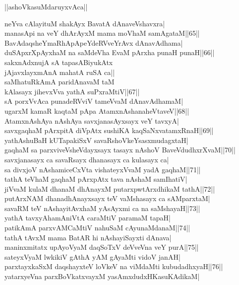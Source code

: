 \documentclass{article}
\begin{document}
\begin{center}
||ashoVkasuMdaruyxvAca||
\end{center}

neYva cAlayituM shakAyx BavatA dAnaveVshavxra|\\
manasApi na veY dhArAyxM mama moVhaM samAgataM||65||\\
BavAdaqsheYmaRhApApeYdeRVveYrAvx dAnavAdhama|\\
duSApxrXpAyxhaM na saMdeVha EvaM pArxha punaH punaH||66||\\
sakxnAdxnujA sA tapasABiyukAtx\\
jAjavxlayxmAnA mahatA ruSA ca||\\
saMhatuRkAmA paridAnavaM taM\\
kAlasayx jihevxVva yathA suPxraMtiV||67||\\
sA porxVvAca punadeRVviV tameVvaM dAnavAdhamaM|\\
ugarxM kamaR kaqtaM pApa AtamxnAshanaheVtaveV||68||\\
AtamxnAshAya nAshAya savxjanasAyxsayx veY tavxyA|\\
savxgaqhaM pArxpitA diVpAtx sushiKA kaqSaNxvatamxRnaH||69||\\
yathAshuBaH kUTapakiSxV savaRshoVkeYsasxmudagxtaH|\\
gaqhaM sa parxviveVsheVdayxsayx tasayx nAshoV BaveVdudhxrXvaM||70||\\
savxjanasayx ca savaRsayx dhanasayx ca kulasayx ca|\\
sa divxjoV nAshamiceCxVta vishateyxVvaM yadA gaqhaM||71||\\
tathA teVhaM gaqhaM pArxpAtx tava nAshaM samIhatiV|\\
jiVvaM kulaM dhanaM dhAnayxM putarxpwtArxdhikaM tathA||72||\\
putArxNAM dhanadhAnayxsayx teV vaMshasayx ca sAMparxtaM|\\
savaRM teV nAshayitAvxhaM yAsAyxmi ca na saMshayaH||73||\\
yathA tavxyAhamAniVtA caraMtiV paramaM tapaH|\\
patikAmA parxvAMCaMtiV nahuSaM cAyunaMdanaM||74||\\
tathA tAvxM mama BatAR hi nAshayiSayxti dAnava|\\
maninxmitatx upAyoVyaM daqSoTxV deVveVna veY purA||75||\\
sateyxVyaM lwkikiV gAthA yAM gAyaMti vidoV janAH|\\
parxtayxkaSxM daqshayxteV loVkeV na viMdaMti kubudadhxyaH||76||\\
yatarxyeVna parxBoVkatxvayxM yasAmxdudxHKasuKAdikaM|\\
\end{document}
